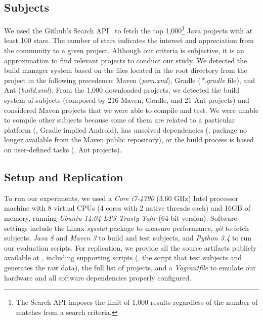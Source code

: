 \subsection{Subjects}
\label{sec:subjects}

We used the Github's
Search API~\cite{githubsearch} to fetch the top 1,000\footnote{The
Search API imposes the limit of 1,000 results regardless of the number
of matches from a search criteria.} Java projects with at least 100
stars. The number of stars indicates the interest and appreciation
from the community to a given project.
 Although our
criteria is subjective, it is an approximation to find relevant
projects to conduct our study. We detected the build manager system
based on the files located in the root directory from the project in
the following precedence: Maven (\emph{pom.xml}), Gradle
(\emph{*.gradle} file), and Ant (\emph{build.xml}). From the 1,000 downloaded projects, we detected the build
system of  subjects (composed by 216 Maven,  Gradle,
and 21 Ant projects) and considered  Maven projects that we
were able to compile and test. We were unable to compile other
subjects because some of them are related to a particular platform
(\eg, Gradle implied Android), has unsolved dependencies (\eg, package
no longer available from the Maven public repository), or the build
process is based on user-defined tasks (\eg, Ant projects).

\subsection{Setup and Replication}
\label{sec:setup}

To run our experiments, we used a \emph{Core i7-4790} (3.60 GHz) Intel
processor machine with 8 virtual CPUs (4 cores with 2 native threads
each) and 16GB of memory, running \emph{Ubuntu 14.04 LTS Trusty Tahr}
(64-bit version). Software settings include the Linux \emph{sysstat}
package to measure performance, \emph{git} to fetch subjects,
\emph{Java 8} and \emph{Maven 3} to build and test subjects, and
\emph{Python 3.4} to run our evaluation scripts. For replication, we
provide all the source artifacts publicly available at , including supporting scripts (\eg, the script that test
subjects and generates the raw data), the full list of projects, and a
\emph{Vagrantfile} to emulate our hardware and all software
dependencies properly configured.

